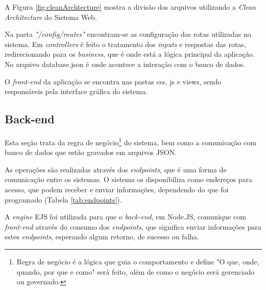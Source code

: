 A Figura \ref{fig:cleanArchtecture} mostra a divisão dos arquivos utilizando a \textit{Clean Architecture} do Sistema Web.

Na pasta \textit{"/config/routes"} encontram-se as configuração das rotas utilizadas no sistema. Em \textit{controllers} é feito o tratamento dos \textit{inputs} e respostas das rotas, redirecionando para os \textit{business}, que é onde está a lógica principal da aplicação. No arquivo database.json é onde acontece a interação com o banco de dados. 

O \textit{front-end} da aplicação se encontra nas pastas css, js e views, sendo responsáveis pela interface gráfica do sistema.

\subsection{Back-end}

Esta seção trata da regra de negócio\footnote{Regra de negócio é a lógica que guia o comportamento e define "O que, onde, quando, por que e como" será feito, além de como o negócio será gerenciado ou governado.} do sistema, bem como a comunicação com banco de dados que estão gravados em arquivos JSON.

As operações são realizadas através dos \textit{endpoints}, que é uma forma de comunicação entre os sistemas. O sistema os disponibiliza como endereços para acesso, que podem receber e enviar informações, dependendo do que foi programado (Tabela \ref{tab:endpoints}).

A \textit{engine} EJS foi utilizada para que o \textit{back-end}, em Node.JS, comunique com \textit{front-end} através do consumo dos \textit{endpoints}, que significa enviar informações para estes \textit{endpoints}, esperando algum retorno, de sucesso ou falha.

